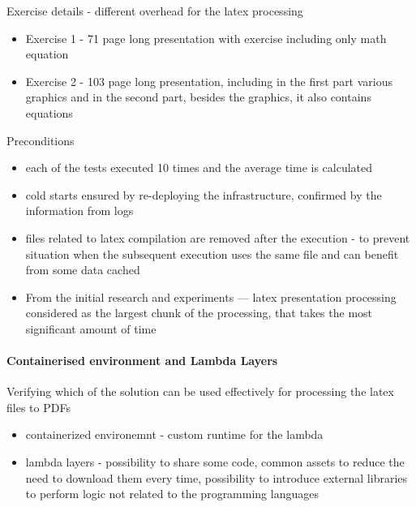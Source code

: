 Exercise details - different overhead for the latex processing

\begin{itemize}
    \item Exercise 1 - 71 page long presentation with exercise including only math equation
    \item Exercise 2 - 103 page long presentation, including in the first part various graphics and in the second part, besides the graphics, it also contains equations
\end{itemize}

Preconditions

\begin{itemize}
    \item each of the tests executed 10 times and the average time is calculated
    \item cold starts ensured by re-deploying the infrastructure, confirmed by the information from logs
    \item files related to latex compilation are removed after the execution - to prevent situation when the subsequent execution uses the same file and can benefit from some data cached
    \item From the initial research and experiments --- latex presentation processing considered as the largest chunk of the processing, that takes the most significant amount of time
\end{itemize}

\paragraph{Containerised environment and Lambda Layers}

Verifying which of the solution can be used effectively for processing the latex files to PDFs

\begin{itemize}
    \item containerized environemnt - custom runtime for the lambda
    \item lambda layers - possibility to share some code, common assets to reduce the need to download them every time, possibility to introduce external libraries to perform logic not related to the programming languages
\end{itemize}

\datasetLayerVsImage

